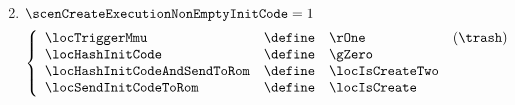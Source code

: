 \begin{enumerate}
\[		\]
	\item \If $\scenCreateExecutionNonEmptyInitCode = 1$ \Then
		\[
			\left\{ \begin{array}{lclr}
				\locTriggerMmu               & \define & \rOne            & (\trash) \\
				\locHashInitCode             & \define & \gZero          \\
				\locHashInitCodeAndSendToRom & \define & \locIsCreateTwo \\
				\locSendInitCodeToRom        & \define & \locIsCreate    \\
			\end{array} \right.
		\]
\end{enumerate}
